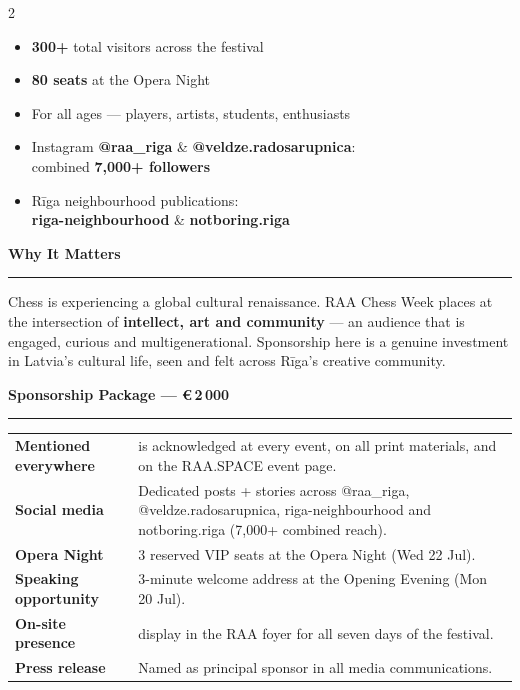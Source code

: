 \documentclass[a4paper,10pt]{article}
\newcommand{\sectionrule}[1]{%
  \vspace{5pt}%
  {\color{raared}\bfseries\large #1}\\[-3pt]%
  {\color{raared}\rule{\linewidth}{0.8pt}}%
  \vspace{3pt}%
}
\begin{document}
\begin{center}
\begin{minipage}{0.87\paperwidth}
\begin{multicols}{2}
{\small
\begin{itemize}[leftmargin=*,itemsep=1.5pt,topsep=0pt]
  \item \textbf{300+} total visitors across the festival
  \item \textbf{80 seats} at the Opera Night
  \item For all ages — players, artists, students, enthusiasts
  \item Instagram \textbf{@raa\_riga} \& \textbf{@veldze.radosarupnica}:\\
        combined \textbf{7,000+ followers}
  \item Rīga neighbourhood publications:\\
        \textbf{riga-neighbourhood} \& \textbf{notboring.riga}
\end{itemize}
}

\vspace{0.25cm}
\sectionrule{Why It Matters}

{\small Chess is experiencing a global cultural renaissance. RAA Chess Week places \textbf{\sponsor} at the intersection of \textbf{intellect, art and community} — an audience that is engaged, curious and multigenerational. Sponsorship here is a genuine investment in Latvia's cultural life, seen and felt across Rīga's creative community.}

\end{multicols}

\vspace{0.12cm}

\sectionrule{Sponsorship Package — €\,2\,000}

{\small
\begin{tabularx}{\linewidth}{@{} >{\bfseries}p{3.3cm} X @{}}
Mentioned everywhere  & \sponsor{} is acknowledged at every event, on all print materials, and on the RAA.SPACE event page. \\[2pt]
Social media          & Dedicated posts + stories across @raa\_riga, @veldze.radosarupnica, riga-neighbourhood and notboring.riga (7,000+ combined reach). \\[2pt]
Opera Night           & 3 reserved VIP seats at the Opera Night (Wed 22 Jul). \\[2pt]
Speaking opportunity  & 3-minute welcome address at the Opening Evening (Mon 20 Jul). \\[2pt]
On-site presence      & \sponsor{} display in the RAA foyer for all seven days of the festival. \\[2pt]
Press release         & Named as principal sponsor in all media communications. \\
\end{tabularx}
}


\end{minipage}
\end{center}
\end{document}

